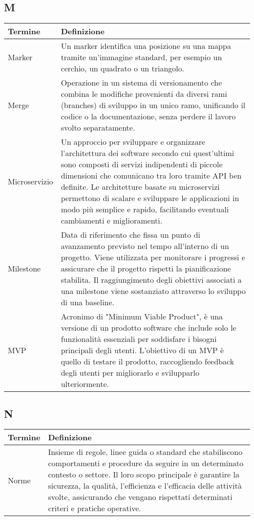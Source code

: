 \documentclass[10pt]{article}
\begin{document}
\subsection{M} %
\begin{longtable}{|>{\centering\arraybackslash}m{2.5cm}|>{\arraybackslash}m{12.5cm}|}
\hline
\rowcolor[gray]{0.8}
\textbf{Termine} & \textbf{Definizione}\\
\endhead
\hline
Marker & Un marker identifica una posizione su una mappa tramite un'immagine standard, per esempio un cerchio, un quadrato o un triangolo.\\
\hline
Merge & Operazione in un sistema di versionamento che combina le modifiche provenienti da diversi rami (branches) di sviluppo in un unico ramo, unificando il codice o la documentazione, senza perdere il lavoro svolto separatamente.\\
\hline
Microservizio & Un approccio per sviluppare e organizzare l’architettura dei software secondo cui quest’ultimi sono composti di servizi indipendenti di piccole dimensioni che comunicano tra loro tramite API ben definite. Le architetture basate su microservizi permettono di scalare e sviluppare le applicazioni in modo più semplice e rapido, facilitando eventuali cambiamenti e miglioramenti.\\
\hline
Milestone & Data di riferimento che fissa un punto di avanzamento previsto nel tempo all'interno di un progetto. Viene utilizzata per monitorare i progressi e assicurare che il progetto rispetti la pianificazione stabilita. Il raggiungimento degli obiettivi associati a una milestone viene sostanziato attraverso lo sviluppo di una baseline.\\
\hline
MVP & Acronimo di "Minimum Viable Product", è una versione di un prodotto software che include solo le funzionalità essenziali per soddisfare i bisogni principali degli utenti. L'obiettivo di un MVP è quello di testare il prodotto, raccogliendo feedback degli utenti per migliorarlo e svilupparlo ulteriormente.\\
\hline
\end{longtable}

\subsection{N} %
\begin{longtable}{|>{\centering\arraybackslash}m{2.5cm}|>{\arraybackslash}m{12.5cm}|}
\hline
\rowcolor[gray]{0.8}
\textbf{Termine} & \textbf{Definizione}\\
\endhead
\hline
Norme & Insieme di regole, linee guida o standard che stabiliscono comportamenti e procedure da seguire in un determinato contesto o settore. Il loro scopo principale è garantire la sicurezza, la qualità, l'efficienza e l'efficacia delle attività svolte, assicurando che vengano rispettati determinati criteri e pratiche operative.\\
\hline
\end{longtable}
\end{document}
